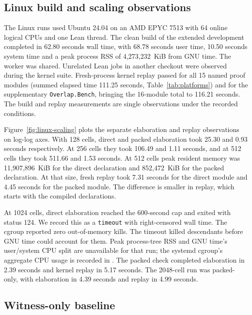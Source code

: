 \documentclass[sigplan,10pt,anonymous,review,balance=false]{acmart}
\newcommand{\leanid}[1]{\texttt{#1}}
\begin{document}
\subsection{Linux build and scaling observations}

The Linux runs used Ubuntu 24.04 on an AMD EPYC 7513 with
64 online logical CPUs and one Lean thread. The clean build of
the extended development completed in 62.80 seconds wall time,
with 68.78 seconds user time, 10.50 seconds system time and a
peak process RSS of 4,273,232~KiB from GNU time. The worker was
shared. Unrelated Lean jobs in another checkout were observed
during the kernel suite. Fresh-process kernel replay passed for
all 15 named proof modules (summed elapsed time 111.25 seconds,
Table~\ref{tab:platforms}) and for the supplementary
\leanid{Overlap.Bench}, bringing the 16-module total to
116.21 seconds. The build and replay measurements are single
observations under the recorded conditions.

Figure~\ref{fig:linux-scaling} plots the separate elaboration
and replay observations on log-log axes. With 128 cells, direct and packed
elaboration took 25.30 and 0.93 seconds respectively. At 256 cells
they took 106.49 and
1.11 seconds, and at 512 cells they took 511.66 and 1.53 seconds.
At 512 cells peak resident memory was 11,907,896~KiB for the
direct declaration and 852,472~KiB for the packed declaration.
At that size, fresh replay took 7.31 seconds for the direct module
and 4.45 seconds for the packed module. The difference is smaller
in replay, which starts with the compiled declarations.

At 1024 cells, direct elaboration reached the 600-second cap
and exited with status 124. We record this as a
\leanid{timeout} with right-censored wall time. The cgroup
reported zero out-of-memory kills. The timeout killed descendants
before GNU time could account for them. Peak process-tree RSS and
GNU time's user/system CPU split are unavailable for that run; the
systemd cgroup's aggregate CPU usage is recorded in
.
The packed check
completed elaboration in 2.39 seconds and kernel replay in
5.17 seconds. The 2048-cell run was packed-only, with
elaboration in 4.39 seconds and replay in 4.99 seconds.



\subsection{Witness-only baseline}
\end{document}
